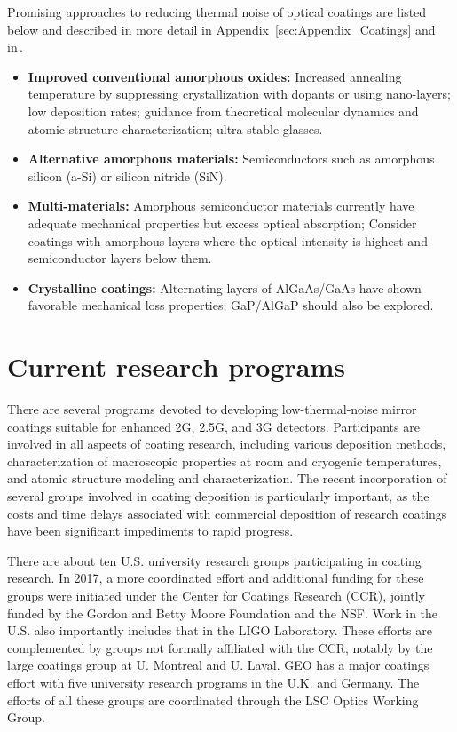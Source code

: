 Promising approaches to reducing thermal noise of optical coatings are listed below and described in more detail in Appendix~\ref{sec:Appendix_Coatings} and in\,\cite{DawnIV2018}.
\begin{itemize}
    \item\textbf{Improved conventional amorphous oxides:} Increased annealing temperature by suppressing crystallization with dopants or using nano-layers; low deposition rates; guidance from theoretical molecular dynamics and atomic structure characterization; ultra-stable glasses.
    \item\textbf{Alternative amorphous materials:} Semiconductors such as amorphous silicon (a-Si) or silicon nitride (SiN).
    \item\textbf{Multi-materials:} Amorphous semiconductor materials currently have adequate mechanical properties but excess optical absorption; Consider coatings with amorphous layers where the optical intensity is highest and semiconductor layers below them.
    \item\textbf{Crystalline coatings:} Alternating layers of AlGaAs/GaAs have shown favorable mechanical loss properties; GaP/AlGaP should also be explored.
\end{itemize}

\section{Current research programs}

There are several 
programs devoted to developing low-thermal-noise mirror coatings suitable for enhanced 2G, 2.5G, and 3G detectors. Participants are involved in all aspects of coating research, including various deposition methods, characterization of macroscopic properties at room and cryogenic temperatures, and atomic structure modeling and characterization. The recent incorporation 
of several groups involved in coating deposition is particularly important, as the costs and time delays associated with commercial deposition of research coatings have been significant impediments to rapid progress.

There are about ten U.S. university research groups participating in 
coating research. In 2017, a more coordinated effort and additional funding for these groups were initiated under the Center for Coatings Research (CCR), jointly funded by the Gordon and Betty Moore Foundation and the NSF. Work in the U.S. also importantly includes that in the LIGO Laboratory. These efforts are complemented by groups not formally affiliated with the CCR, notably by the large coatings group at U. Montreal and U. Laval. GEO has a major coatings effort with five university research programs in the U.K. and Germany. 
The efforts of all these groups are coordinated through 
the LSC Optics Working Group.

